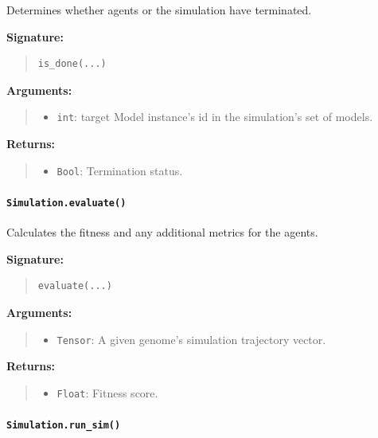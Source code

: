 \documentclass[11pt]{article}
\begin{document}
Determines whether agents or the simulation have terminated.

\textbf{Signature:}
\begin{quote}
\begin{verbatim}
is_done(...)
\end{verbatim}
\end{quote}

\textbf{Arguments:}
\begin{quote}
\begin{itemize}
    \item \texttt{int}: target Model instance's id in the simulation's set of models.
\end{itemize}
\end{quote}

\textbf{Returns:}
\begin{quote}
\begin{itemize}
    \item \texttt{Bool}: Termination status.
\end{itemize}
\end{quote}

\paragraph{\texttt{Simulation.evaluate()}}

Calculates the fitness and any additional metrics for the agents.

\textbf{Signature:}
\begin{quote}
\begin{verbatim}
evaluate(...)
\end{verbatim}
\end{quote}

\textbf{Arguments:}
\begin{quote}
\begin{itemize}
    \item \texttt{Tensor}: A given genome's simulation trajectory vector.
\end{itemize}
\end{quote}

\textbf{Returns:}
\begin{quote}
\begin{itemize}
    \item \texttt{Float}: Fitness score.
\end{itemize}
\end{quote}

\paragraph{\texttt{Simulation.run\_sim()}}
\end{document}
